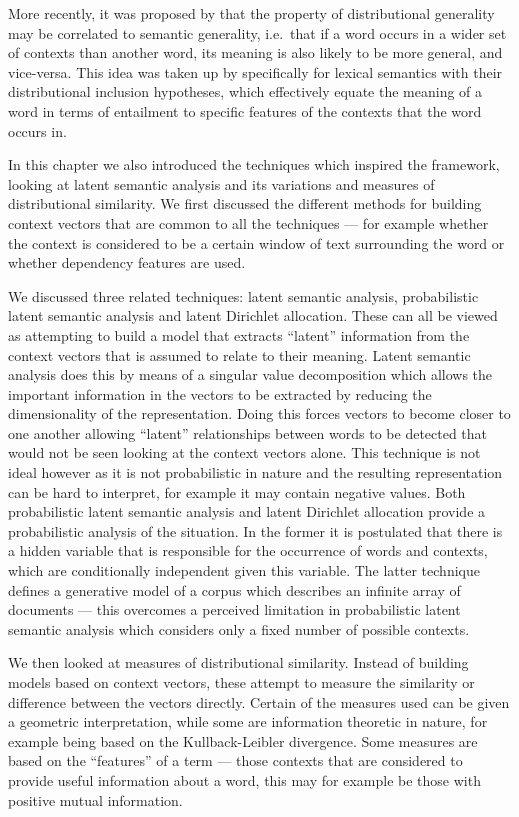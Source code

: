 More recently, it was proposed by \cite{Weeds:04} that the property of distributional generality may be correlated to semantic generality, i.e.~that if a word occurs in a wider set of contexts than another word, its meaning is also likely to be more general, and vice-versa. This idea was taken up by \cite{Geffet:05} specifically for lexical semantics with their distributional inclusion hypotheses, which effectively equate the meaning of a word in terms of entailment to specific features of the contexts that the word occurs in.

In this chapter we also introduced the techniques which inspired the framework, looking at latent semantic analysis and its variations and measures of distributional similarity. We first discussed the different methods for building context vectors that are common to all the techniques --- for example whether the context is considered to be a certain window of text surrounding the word or whether dependency features are used.

We discussed three related techniques: latent semantic analysis, probabilistic latent semantic analysis and latent Dirichlet allocation. These can all be viewed as attempting to build a model that extracts ``latent'' information from the context vectors that is assumed to relate to their meaning. Latent semantic analysis does this by means of a singular value decomposition which allows the important information in the vectors to be extracted by reducing the dimensionality of the representation. Doing this forces vectors to become closer to one another allowing ``latent'' relationships between words to be detected that would not be seen looking at the context vectors alone. This technique is not ideal however as it is not probabilistic in nature and the resulting representation can be hard to interpret, for example it may contain negative values. Both probabilistic latent semantic analysis and latent Dirichlet allocation provide a probabilistic analysis of the situation. In the former it is postulated that there is a hidden variable that is responsible for the occurrence of words and contexts, which are conditionally independent given this variable. The latter technique defines a generative model of a corpus which describes an infinite array of documents --- this overcomes a perceived limitation in probabilistic latent semantic analysis which considers only a fixed number of possible contexts.

We then looked at measures of distributional similarity. Instead of building models based on context vectors, these attempt to measure the similarity or difference between the vectors directly. Certain of the measures used can be given a geometric interpretation, while some are information theoretic in nature, for example being based on the Kullback-Leibler divergence. Some measures are based on the ``features'' of a term --- those contexts that are considered to provide useful information about a word, this may for example be those with positive mutual information.



